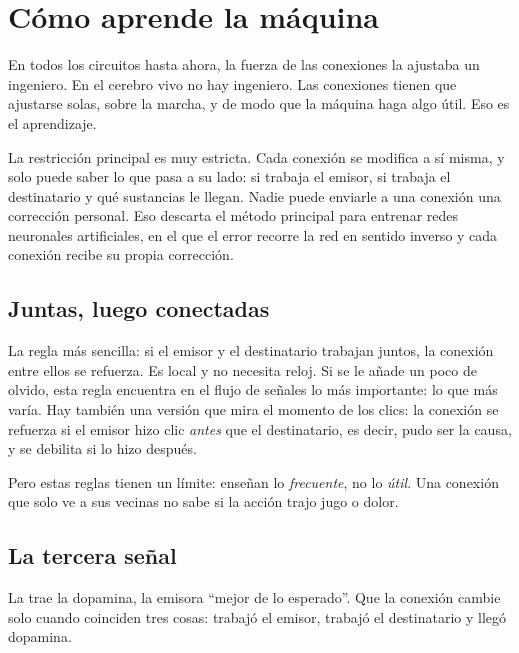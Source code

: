 \chapter{Cómo aprende la máquina}

En todos los circuitos hasta ahora, la fuerza de las conexiones la ajustaba un ingeniero. En el cerebro vivo no hay ingeniero. Las conexiones tienen que ajustarse solas, sobre la marcha, y de modo que la máquina haga algo útil. Eso es el aprendizaje.

La restricción principal es muy estricta. Cada conexión se modifica a sí misma, y solo puede saber lo que pasa a su lado: si trabaja el emisor, si trabaja el destinatario y qué sustancias le llegan. Nadie puede enviarle a una conexión una corrección personal. Eso descarta el método principal para entrenar redes neuronales artificiales, en el que el error recorre la red en sentido inverso y cada conexión recibe su propia corrección.

\section*{Juntas, luego conectadas}

La regla más sencilla: si el emisor y el destinatario trabajan juntos, la conexión entre ellos se refuerza. Es local y no necesita reloj. Si se le añade un poco de olvido, esta regla encuentra en el flujo de señales lo más importante: lo que más varía. Hay también una versión que mira el momento de los clics: la conexión se refuerza si el emisor hizo clic \emph{antes} que el destinatario, es decir, pudo ser la causa, y se debilita si lo hizo después.

Pero estas reglas tienen un límite: enseñan lo \emph{frecuente}, no lo \emph{útil}. Una conexión que solo ve a sus vecinas no sabe si la acción trajo jugo o dolor.

\section*{La tercera señal}

La trae la dopamina, la emisora “mejor de lo esperado”. Que la conexión cambie solo cuando coinciden tres cosas: trabajó el emisor, trabajó el destinatario y llegó dopamina.


